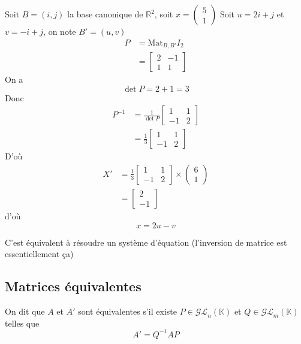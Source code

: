 \documentclass[11pt,colorlinks]{book}
\theoremstyle{mytheoremstyle}
\theoremstyle{mytheoremstyle}
\theoremstyle{mytheoremstyle}
\theoremstyle{mytheoremstyle}
\theoremstyle{mytheoremstyle}
\theoremstyle{mytheoremstyle}
\theoremstyle{mytheoremstyle}
\theoremstyle{mytheoremstyle}
\theoremstyle{myproblemstyle}
\def\mbb#1{\mathbb{#1}}
\def\mfc#1{\mathcal{#1}}
\def\bR{\mbb{R}}
\def\bK{\mbb{K}}
\begin{document}
\begin{ex}
  Soit $B = (i,j)$ la base canonique de $\bR^2$, soit $x = \begin{pmatrix}
    5 \\ 
    1
  \end{pmatrix}$
  Soit $u = 2i + j$ et $v = -i + j$, on note $B' = (u,v)$
  \begin{align*}
    P &= \text{Mat}_{B,B'} I_2 \\ 
      &= \begin{bmatrix}
        2 & -1 \\ 
        1 & 1
      \end{bmatrix}
  \end{align*}
  On a 
  \begin{equation*}
    \det P = 2 + 1 = 3
  \end{equation*}
  Donc 
  \begin{align*}
    P^{-1} &= \frac{1}{\det P} \begin{bmatrix}
      1 & 1 \\ 
      -1 & 2
    \end{bmatrix} \\ 
    &= \frac{1}{3} \begin{bmatrix}
      1 & 1 \\ 
      -1 & 2
    \end{bmatrix}
  \end{align*}
  D'où
  \begin{align*}
    X' &= \frac{1}{3} \begin{bmatrix}
      1 & 1 \\ 
      -1 & 2
    \end{bmatrix} \times \begin{pmatrix}
      6 \\ 
      1
    \end{pmatrix} \\ 
    &= \begin{bmatrix}
      2 \\ 
      -1
    \end{bmatrix}
  \end{align*}
  d'où
  \begin{equation*}
    x = 2u - v
  \end{equation*}
  \begin{rmq}
    C'est équivalent à résoudre un système d'équation (l'inversion de matrice est essentiellement ça)
  \end{rmq}
\end{ex}
\subsection{Matrices équivalentes}
\begin{definition}
  On dit que $A$ et $A'$ sont équivalentes s'il existe $P \in \mfc{GL}_n(\bK)$ et $Q \in \mfc{GL}_m(\bK)$ telles que 
  \begin{equation*}
    A' = Q^{-1} A P
  \end{equation*}
\end{definition}
\end{document}
